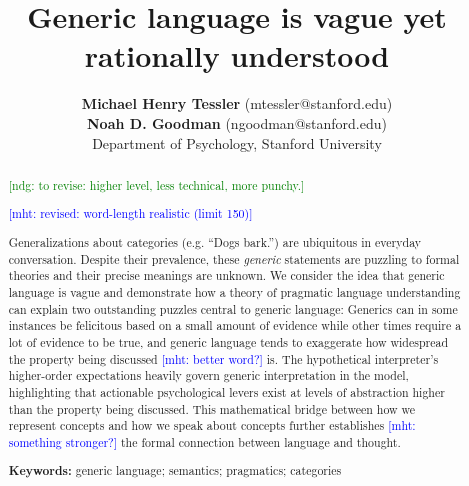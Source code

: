 \documentclass[10pt,letterpaper]{article}
\title{Generic language is vague yet rationally understood}
\author{{\large \bf Michael Henry Tessler} (mtessler@stanford.edu)\\ {\large \bf Noah D. Goodman} (ngoodman@stanford.edu) \\
  Department of Psychology, Stanford University}
\newcommand{\ndg}[1]{\textcolor{Green}{[ndg: #1]}}
\newcommand{\mht}[1]{\textcolor{Blue}{[mht: #1]}}
\begin{document}
\maketitle


\begin{abstract}
\ndg{to revise: higher level, less technical, more punchy.}

\mht{revised: word-length realistic (limit 150)}

Generalizations about categories (e.g. ``Dogs bark.'') are ubiquitous in everyday conversation. 
Despite their prevalence, these \emph{generic} statements are puzzling to formal theories and their precise meanings are unknown. 
We consider the idea that generic language is vague and demonstrate how a theory of pragmatic language understanding can 
explain two outstanding puzzles central to generic language: Generics can in some instances be felicitous based on a small amount of evidence while other times require a lot of evidence to be true, and generic language tends to exaggerate how widespread the property being discussed \mht{better word?}  is. 
The hypothetical interpreter's higher-order expectations heavily govern generic interpretation in the model, highlighting that actionable psychological levers exist at levels of abstraction higher than the property being discussed.
This mathematical bridge between how we represent concepts and how we speak about concepts further establishes \mht{something stronger?} the formal connection between language and thought.


%
%


\textbf{Keywords:} 
generic language; semantics; pragmatics; categories
\end{abstract}
\end{document}
